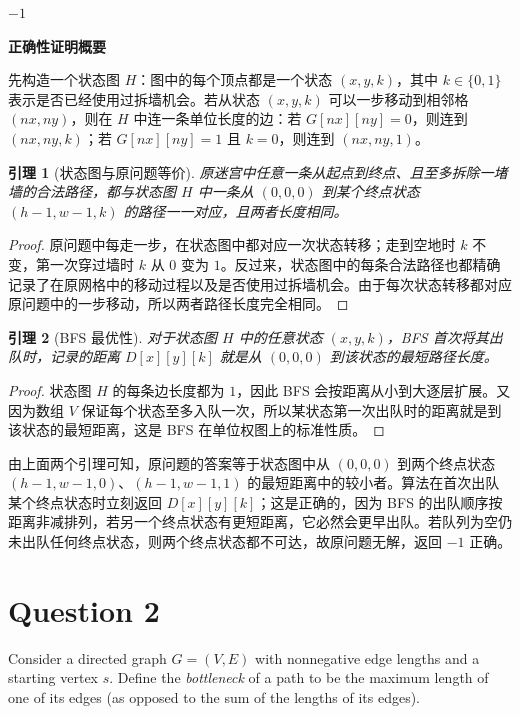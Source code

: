 ﻿\documentclass[12pt,a4paper]{article}
\newtheorem{lemma}{引理}
\begin{document}
\begin{answerbox}
\begin{algorithm}[H]
\begin{algorithmic}[1]
\RETURN $-1$
\end{algorithmic}
\end{algorithm}

\textbf{正确性证明概要}

先构造一个状态图 $H$：图中的每个顶点都是一个状态 $(x,y,k)$，其中 $k \in \{0,1\}$ 表示是否已经使用过拆墙机会。若从状态 $(x,y,k)$ 可以一步移动到相邻格 $(nx,ny)$，则在 $H$ 中连一条单位长度的边：若 $G[nx][ny]=0$，则连到 $(nx,ny,k)$；若 $G[nx][ny]=1$ 且 $k=0$，则连到 $(nx,ny,1)$。

\begin{lemma}[状态图与原问题等价]
原迷宫中任意一条从起点到终点、且至多拆除一堵墙的合法路径，都与状态图 $H$ 中一条从 $(0,0,0)$ 到某个终点状态 $(h-1,w-1,k)$ 的路径一一对应，且两者长度相同。
\end{lemma}

\begin{proof}
原问题中每走一步，在状态图中都对应一次状态转移；走到空地时 $k$ 不变，第一次穿过墙时 $k$ 从 $0$ 变为 $1$。反过来，状态图中的每条合法路径也都精确记录了在原网格中的移动过程以及是否使用过拆墙机会。由于每次状态转移都对应原问题中的一步移动，所以两者路径长度完全相同。
\end{proof}

\begin{lemma}[BFS 最优性]
对于状态图 $H$ 中的任意状态 $(x,y,k)$，BFS 首次将其出队时，记录的距离 $D[x][y][k]$ 就是从 $(0,0,0)$ 到该状态的最短路径长度。
\end{lemma}

\begin{proof}
状态图 $H$ 的每条边长度都为 $1$，因此 BFS 会按距离从小到大逐层扩展。又因为数组 $V$ 保证每个状态至多入队一次，所以某状态第一次出队时的距离就是到该状态的最短距离，这是 BFS 在单位权图上的标准性质。
\end{proof}

由上面两个引理可知，原问题的答案等于状态图中从 $(0,0,0)$ 到两个终点状态 $(h-1,w-1,0)$、$(h-1,w-1,1)$ 的最短距离中的较小者。算法在首次出队某个终点状态时立刻返回 $D[x][y][k]$；这是正确的，因为 BFS 的出队顺序按距离非减排列，若另一个终点状态有更短距离，它必然会更早出队。若队列为空仍未出队任何终点状态，则两个终点状态都不可达，故原问题无解，返回 $-1$ 正确。
\end{answerbox}

\section{Question 2}

Consider a directed graph $G = (V, E)$ with nonnegative edge lengths and a starting vertex $s$. Define the \emph{bottleneck} of a path to be the maximum length of one of its edges (as opposed to the sum of the lengths of its edges).
\end{document}
